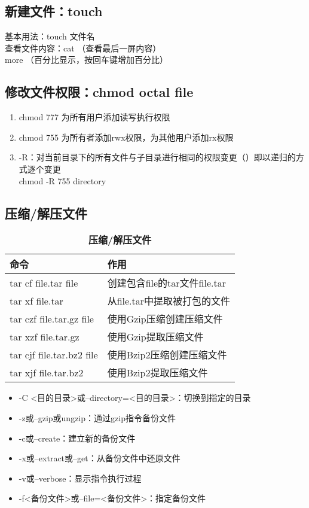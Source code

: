 \documentclass{article}
\begin{document}
\subsection{新建文件：touch}
基本用法：touch 文件名\\
查看文件内容：cat （查看最后一屏内容）\\
more （百分比显示，按回车键增加百分比）

\subsection{修改文件权限：chmod octal file}
\begin{enumerate}
    \item chmod 777 为所有用户添加读写执行权限
    \item chmod 755 为所有者添加rwx权限，为其他用户添加rx权限
    \item -R：对当前目录下的所有文件与子目录进行相同的权限变更（）即以递归的方式逐个变更\\
    chmod -R 755 directory
\end{enumerate}

\subsection{压缩/解压文件}
\begin{table}[htb]
    \centering
    \caption{\textbf{压缩/解压文件}}
    \begin{tabular}{l|l}
        \hline
        \hspace{3.5em}\textbf{命令}&\hspace{5em}\textbf{作用}\\
        \hline
        tar cf file.tar file&创建包含file的tar文件file.tar\\
        tar xf file.tar&从file.tar中提取被打包的文件\\
        tar czf file.tar.gz file&使用Gzip压缩创建压缩文件\\
        tar xzf file.tar.gz&使用Gzip提取压缩文件\\
        tar cjf file.tar.bz2 file&使用Bzip2压缩创建压缩文件\\
        tar xjf file.tar.bz2&使用Bzip2提取压缩文件\\
        \hline
    \end{tabular}
\end{table}
\begin{itemize}
    \item -C <目的目录>或--directory=<目的目录>：切换到指定的目录
    \item -z或--gzip或ungzip：通过gzip指令备份文件
    \item -c或--create：建立新的备份文件
    \item -x或--extract或--get：从备份文件中还原文件
    \item -v或--verbose：显示指令执行过程
    \item -f<备份文件>或--file=<备份文件>：指定备份文件
\end{itemize}
\end{document}

